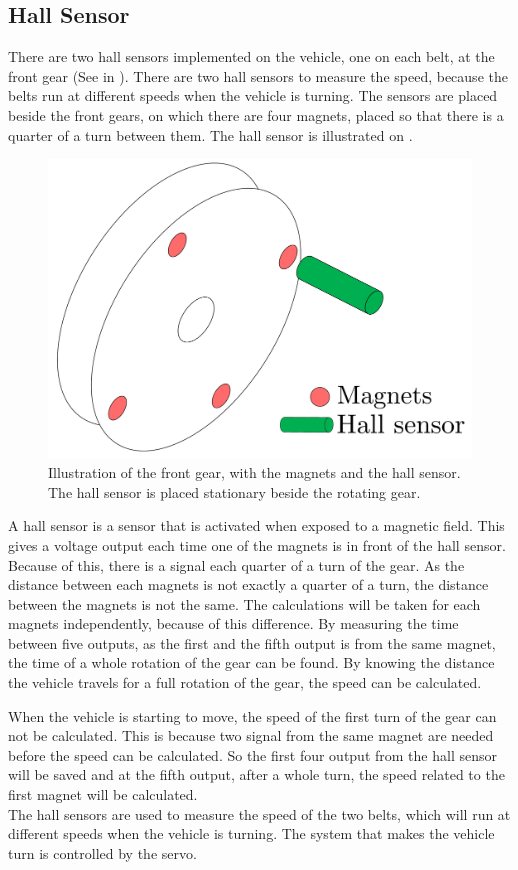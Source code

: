 \subsection{Hall Sensor}
There are two hall sensors implemented on the vehicle, one on each belt, at the front gear (See  in \secref{}). There are two hall sensors to measure the speed, because the belts run at different speeds when the vehicle is turning. The sensors are placed beside the front gears, on which there are four magnets, placed so that there is a quarter of a turn between them. The hall sensor is illustrated on .

 \begin{figure}[H]
	\centering
	\includegraphics[scale=0.5]{figures/HallSensor3D.pdf}
	\caption{Illustration of the front gear, with the magnets and the hall sensor. The hall sensor is placed stationary beside the rotating gear.}
	\label{HallSensor}
\end{figure}

A hall sensor is a sensor that is activated when exposed to a magnetic field. This gives a voltage output each time one of the magnets is in front of the hall sensor. Because of this, there is a signal each quarter of a turn of the gear. As the distance between each magnets is not exactly a quarter of a turn, the distance between the magnets is not the same. The calculations will be taken for each magnets independently, because of this difference.
By measuring the time between five outputs, as the first and the fifth output is from the same magnet, the time of a whole rotation of the gear can be found. By knowing the distance the vehicle travels for a full rotation of the gear, the speed can be calculated.

When the vehicle is starting to move, the speed of the first turn of the gear can not be calculated. This is because two signal from the same magnet are needed before the speed can be calculated. So the first four output from the hall sensor will be saved and at the fifth output, after a whole turn, the speed related to the first magnet will be calculated.\\

The hall sensors are used to measure the speed of the two belts, which will run at different speeds when the vehicle is turning. The system that makes the vehicle turn is controlled by the servo.
